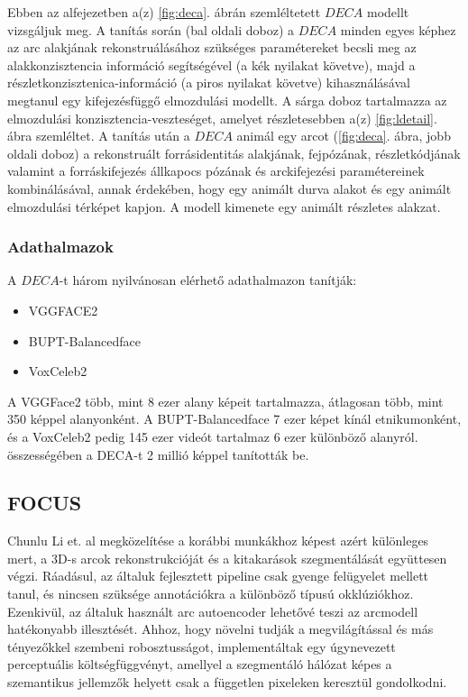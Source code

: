 \documentclass[12pt,a4]{article}
\begin{document}
 	Ebben az alfejezetben a(z) \ref{fig:deca}. ábrán szemléltetett $DECA$ modellt
 	vizsgáljuk meg.
 	A tanítás során (bal oldali doboz) a $DECA$ minden egyes képhez
 	az arc alakjának rekonstruálásához szükséges paramétereket becsli meg az
 	alakkonzisztencia információ segítségével (a kék nyilakat követve), majd
 	a részletkonzisztenica-információ (a piros nyilakat követve) kihasználásával
 	megtanul egy kifejezésfüggő elmozdulási modellt. A sárga doboz tartalmazza
 	az elmozdulási konzisztencia-veszteséget, amelyet részletesebben a(z) \ref{fig:ldetail}. ábra
 	szemléltet.
 	A tanítás után a $DECA$ animál egy arcot (\ref{fig:deca}. ábra, jobb oldali doboz)
 	a rekonstruált forrásidentitás alakjának, fejpózának, részletkódjának
 	valamint a forráskifejezés állkapocs pózának és arckifejezési paramétereinek
 	kombinálásával, annak érdekében, hogy egy animált durva alakot és egy
 	animált elmozdulási térképet kapjon. A modell kimenete egy animált
 	részletes alakzat.
 	
 	\subsubsection{Adathalmazok}
 	
 	A $DECA$-t három nyilvánosan elérhető adathalmazon tanítják:
 	\begin{itemize}
 		\item VGGFACE2
 		\item BUPT-Balancedface
 		\item VoxCeleb2
 	\end{itemize}
 
 	A VGGFace2 több, mint 8 ezer alany képeit tartalmazza, átlagosan több,
 	mint 350 képpel alanyonként. A BUPT-Balancedface 7 ezer képet kínál
 	etnikumonként, és a VoxCeleb2 pedig 145 ezer videót tartalmaz 6 ezer
 	különböző alanyról. összességében a DECA-t 2 millió képpel tanították
 	be.
 	
 	\subsection{FOCUS}
 	
 	Chunlu Li et. al \cite{focus} megközelítése a korábbi munkákhoz képest azért
 	különleges mert, a 3D-s arcok rekonstrukcióját és a kitakarások szegmentálását
 	együttesen végzi. Ráadásul, az általuk fejlesztett pipeline csak gyenge felügyelet mellett tanul, és nincsen szüksége annotációkra a különböző típusú
 	okklúziókhoz.
 	Ezenkivül, az általuk használt arc autoencoder lehetővé teszi az arcmodell hatékonyabb illesztését. Ahhoz, hogy növelni tudják a megvilágítással és
 	más tényezőkkel szembeni robosztusságot, implementáltak egy úgynevezett
 	perceptuális költségfüggvényt, amellyel a szegmentáló hálózat képes a szemantikus jellemzők helyett csak a független pixeleken keresztül gondolkodni.
 	
\end{document}
